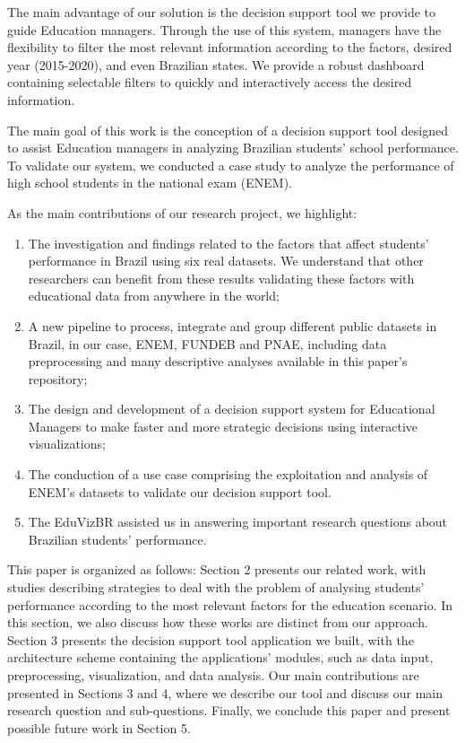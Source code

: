 \documentclass[12pt]{article}
\begin{document}
The main advantage of our solution is the decision support tool we provide to guide Education managers. Through the use of this system, managers have the flexibility to filter the most relevant information according to the factors, desired year (2015-2020), and even Brazilian states. We provide a robust dashboard containing selectable filters to quickly and interactively access the desired information.

The main goal of this work is the conception of a decision support tool designed to assist Education managers in analyzing Brazilian students' school performance. To validate our system, we conducted a case study to analyze the performance of high school students in the national exam (ENEM).
 
As the main contributions of our research project, we highlight: 

\begin{enumerate}
    \item The investigation and findings related to the factors that affect students’ performance in Brazil using six real datasets. We understand that other researchers can benefit from these results validating these factors with educational data from anywhere in the world;
    \item  A new pipeline to process, integrate and group different public datasets in Brazil, in our case, ENEM, FUNDEB and PNAE, including data preprocessing and many descriptive analyses available in this paper's repository; 
    \item The design and development of a decision support system for Educational Managers to make faster and more strategic decisions using interactive visualizations;
    \item The conduction of a use case comprising the exploitation and analysis of ENEM's datasets to validate our decision support tool.
    \item The EduVizBR assisted us in answering important research questions about Brazilian students' performance.
    
\end{enumerate}

This paper is organized as follows: Section 2 presents our related work, with studies describing strategies to deal with the problem of analysing students' performance according to the most relevant factors for the education scenario. In this section, we also discuss how these works are distinct from our approach. Section 3 presents the decision support tool application we built, with the architecture scheme containing the applications' modules, such as data input, preprocessing, visualization, and data analysis. Our main contributions are presented in Sections 3 and 4, where we describe our tool and discuss our main research question and sub-questions. Finally, we conclude this paper and present possible future work in Section 5.
\end{document}
